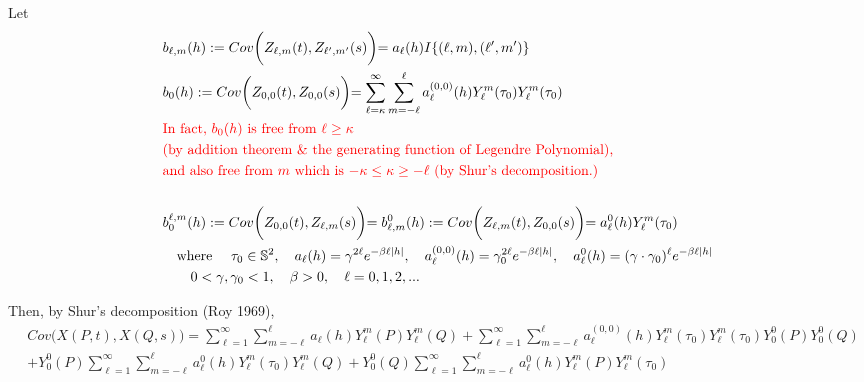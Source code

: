 \documentclass[11pt]{article}
\begin{document}
\begin{itemize}
Let\\
\begin{align*}
&b_{\ell,m}(h) := Cov\biggl( Z_{\ell,m}(t), Z_{\ell',m'}(s) \biggl) = a_{\ell}(h) I\{(\ell,m),(\ell',m')\}\\
&b_{0}(h) := Cov\biggl( Z_{0,0}(t), Z_{0,0}(s) \biggl) = \sum_{\ell=\kappa}^{\infty} \sum_{m=-\ell}^{\ell} a_{\ell}^{(0,0)}(h) Y_{\ell}^{m}(\tau_{0}) Y_{\ell}^{m}(\tau_{0})\\
&\text{\color{red} In fact, $b_0(h)$ is free from $\ell \ge \kappa$}\\
&\text{\color{red} (by addition theorem \& the generating function of Legendre Polynomial), }\\
&\text{\color{red} and also free from $m$ which is $-\kappa \le \kappa \ge -\ell$ (by Shur's decomposition.)}\\
\\
&b_{0}^{\ell,m}(h) := Cov\biggl( Z_{0,0}(t), Z_{\ell,m}(s) \biggl) = b_{\ell,m}^{0}(h) := Cov\biggl( Z_{\ell,m}(t), Z_{0,0}(s) \biggl) = a_{\ell}^{0}(h) Y_{\ell}^{m}(\tau_{0})\\
&\quad \text{where } \quad \tau_{0} \in \mathbb{S}^2, \quad a_{\ell}(h) = \gamma^{2 \ell} e^{-\beta \ell |h|}, \quad a_{\ell}^{(0,0)}(h) = \gamma_{0}^{2 \ell} e^{-\beta \ell |h|}, \quad a_{\ell}^{0}(h) = (\gamma \cdot \gamma_{0})^{\ell} e^{-\beta \ell |h|}\\
&\quad \quad 0<\gamma, \gamma_{0} < 1, \quad \beta >0, \quad \ell=0,1,2,... \\
\end{align*}

Then, by Shur's decomposition (Roy 1969),\\
\begin{align*}
&Cov\biggl(X(P,t), X(Q,s)\biggl) = \sum_{\ell=1}^{\infty} \sum_{m=-\ell}^{\ell}  a_{\ell}(h) Y_{\ell}^{m}(P) Y_{\ell}^{m}(Q) + \sum_{\ell=1}^{\infty} \sum_{m=-\ell}^{\ell} a_{\ell}^{(0,0)}(h) Y_{\ell}^{m}(\tau_0) Y_{\ell}^{m}(\tau_0) Y_{0}^{0}(P) Y_{0}^{0}(Q)\\
&+ Y_{0}^{0}(P) \sum_{\ell=1}^{\infty} \sum_{m=-\ell}^{\ell}  a_{\ell}^0(h) Y_{\ell}^{m}(\tau_0) Y_{\ell}^{m}(Q) + Y_{0}^{0}(Q) \sum_{\ell=1}^{\infty} \sum_{m=-\ell}^{\ell}  a_{\ell}^0(h) Y_{\ell}^{m}(P) Y_{\ell}^{m}(\tau_0)\\
\end{align*}


\end{itemize}
\end{document}
